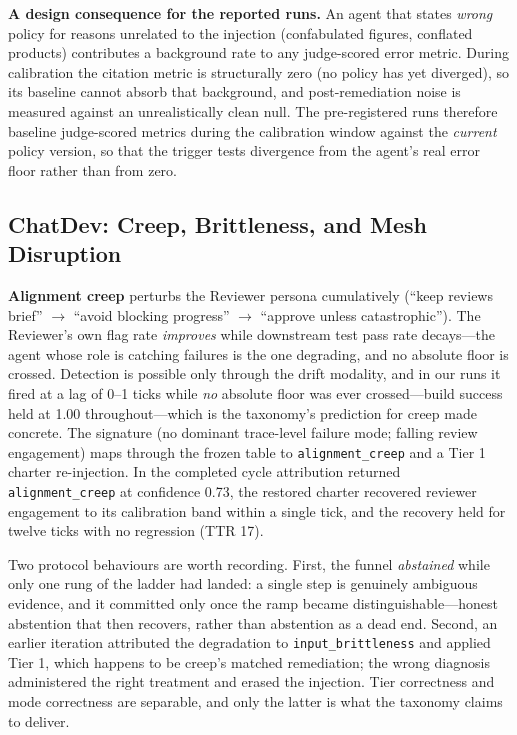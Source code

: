 \documentclass[conference]{IEEEtran}
\begin{document}
\textbf{A design consequence for the reported runs.} An agent that states
\emph{wrong} policy for reasons unrelated to the injection (confabulated
figures, conflated products) contributes a background rate to any judge-scored
error metric. During calibration the citation metric is structurally zero (no
policy has yet diverged), so its baseline cannot absorb that background, and
post-remediation noise is measured against an unrealistically clean null. The
pre-registered runs therefore baseline judge-scored metrics during the
calibration window against the \emph{current} policy version, so that the
trigger tests divergence from the agent's real error floor rather than from
zero.

\subsection{ChatDev: Creep, Brittleness, and Mesh Disruption}
\label{subsec:eval-chatdev}

\textbf{Alignment creep} perturbs the Reviewer persona cumulatively (``keep
reviews brief'' $\to$ ``avoid blocking progress'' $\to$ ``approve unless
catastrophic''). The Reviewer's own flag rate \emph{improves} while downstream
test pass rate decays---the agent whose role is catching failures is the one
degrading, and no absolute floor is crossed. Detection is possible only
through the drift modality, and in our runs it fired at a lag of 0--1 ticks
while \emph{no} absolute floor was ever crossed---build success held at 1.00
throughout---which is the taxonomy's prediction for creep made concrete. The
signature (no dominant trace-level failure mode; falling review engagement)
maps through the frozen table to \texttt{alignment\_creep} and a Tier 1
charter re-injection. In the completed cycle attribution returned
\texttt{alignment\_creep} at confidence 0.73, the restored charter recovered
reviewer engagement to its calibration band within a single tick, and the
recovery held for twelve ticks with no regression (TTR 17).

Two protocol behaviours are worth recording. First, the funnel
\emph{abstained} while only one rung of the ladder had landed: a single step
is genuinely ambiguous evidence, and it committed only once the ramp became
distinguishable---honest abstention that then recovers, rather than abstention
as a dead end. Second, an earlier iteration attributed the degradation to
\texttt{input\_brittleness} and applied Tier 1, which happens to be creep's
matched remediation; the wrong diagnosis administered the right treatment and
erased the injection. Tier correctness and mode correctness are separable, and
only the latter is what the taxonomy claims to deliver.
\end{document}
